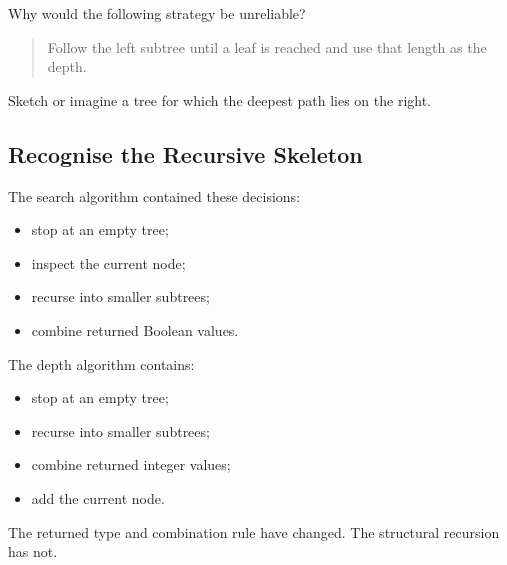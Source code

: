 \documentclass{csc2059practical}
\begin{document}
\begin{reflectionbox}
Why would the following strategy be unreliable?

\begin{quote}
Follow the left subtree until a leaf is reached and use that length as the
depth.
\end{quote}

Sketch or imagine a tree for which the deepest path lies on the right.
\end{reflectionbox}

\subsection{Recognise the Recursive Skeleton}

The search algorithm contained these decisions:

\begin{itemize}
    \item stop at an empty tree;
    \item inspect the current node;
    \item recurse into smaller subtrees;
    \item combine returned Boolean values.
\end{itemize}

The depth algorithm contains:

\begin{itemize}
    \item stop at an empty tree;
    \item recurse into smaller subtrees;
    \item combine returned integer values;
    \item add the current node.
\end{itemize}

The returned type and combination rule have changed. The structural recursion
has not.

%
%
%
%
%
\end{document}
